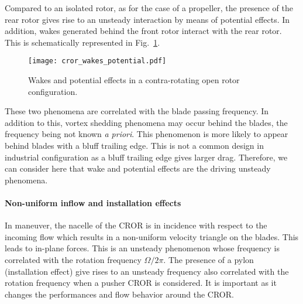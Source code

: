 Compared to an isolated rotor, as for the case of a propeller,
the presence of the rear rotor gives rise to an unsteady
interaction by means of potential effects. In addition, wakes generated
behind the front rotor interact with the rear rotor.
This is schematically represented in Fig.~\ref{fig:cror_wakes_potential}.
\begin{figure}[htp]
  \centering
  \texttt{[image: cror\_wakes\_potential.pdf]}
  \caption{Wakes and potential effects in a 
  contra-rotating open rotor configuration.}
  \label{fig:cror_wakes_potential}
\end{figure}
These two phenomena are correlated with the blade passing frequency.
In addition to this, vortex shedding phenomena may occur behind the blades, 
the frequency being not known \emph{a priori}.
This phenomenon is more likely to appear behind blades with a bluff trailing edge.
This is not a common design in industrial configuration as a bluff trailing edge
gives larger drag. Therefore, we can consider here that 
wake and potential effects are the driving unsteady phenomena.

\paragraph{Non-uniform inflow and installation effects}

In maneuver, the nacelle of the CROR is in incidence with respect to the incoming flow
which results in a non-uniform velocity triangle on the blades.
This leads to in-plane forces. This is an unsteady phenomenon
whose frequency is correlated with the rotation frequency $\Omega / 2 \pi$.
The presence of a pylon (installation effect) give rises to an unsteady frequency
also correlated with the rotation frequency when a pusher CROR is considered.
It is important as it changes the performances and flow behavior around the CROR.
